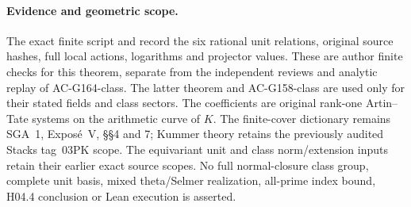 \paragraph{Evidence and geometric scope.}
The exact finite script  and
 record the six rational
unit relations, original source hashes, full local actions,
logarithms and projector values.
These are author finite checks for this theorem, separate
from the independent reviews and analytic replay of
AC-G164-class.
The latter theorem and AC-G158-class are used only for their
stated fields and class sectors.
The coefficients are original rank-one Artin--Tate systems
on the arithmetic curve of $K$.
The finite-cover dictionary remains SGA~1, Expos\'e~V,
\S\S4 and 7; Kummer theory retains the previously audited
Stacks tag~03PK scope.
The equivariant unit and class norm/extension inputs retain
their earlier exact source scopes.
No full normal-closure class group, complete unit basis,
mixed theta/Selmer realization, all-prime index bound,
H04.4 conclusion or Lean execution is asserted.
